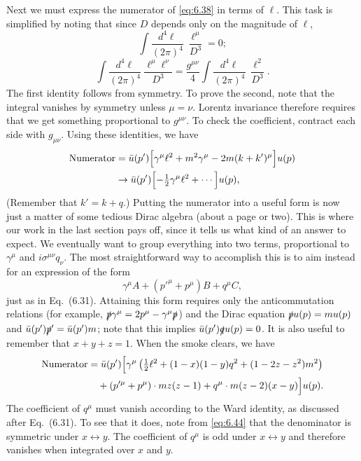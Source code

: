 Next we must express the numerator of \eqref{eq:6.38} in terms of $\ell$.
This task is simplified by noting that since $D$ depends only on the
magnitude of $\ell$,
\begin{equation}
  \int \frac{d^4\ell}{(2\pi)^4}\ \frac{\ell^\mu}{D^3} = 0;
  \label{eq:6.45}
\end{equation}
\begin{equation}
  \int \frac{d^4\ell}{(2\pi)^4}\ \frac{\ell^\mu\ell^\nu}{D^3}
    = \frac{g^{\mu\nu}}{4}\int \frac{d^4\ell}{(2\pi)^4}\ \frac{\ell^2}{D^3} .
  \label{eq:6.46}
\end{equation}
The first identity follows from symmetry.  To prove the second, note that the
integral vanishes by symmetry unless $\mu = \nu$.  Lorentz invariance therefore
requires that we get something proportional to $g^{\mu\nu}$.  To check the
coefficient, contract each side with $g_{\mu\nu}$.  Using these identities, we
have
\begin{equation}
  \begin{aligned}
    \text{Numerator} &= \bar{u}(p')\Bigl[ \gamma^\mu\ell^2 + m^2\gamma^\mu
      - 2m(k+k')^\mu \Bigr]u(p)\\
    &\to \bar{u}(p')\Bigl[ -\tfrac{1}{2}\gamma^\mu\ell^2
      + \cdots \Bigr]u(p),
  \end{aligned}
\end{equation}
(Remember that $k' = k+q$.)
Putting the numerator into a useful form is now just a matter of some tedious
Dirac algebra (about a page or two).  This is where our work in the last
section pays off, since it tells us what kind of an answer to expect.  We
eventually want to group everything into two terms, proportional to
$\gamma^\mu$ and $i\sigma^{\mu\nu}q_\nu$.  The most straightforward way to
accomplish this is to aim instead for an expression of the form
\begin{equation}
  \gamma^\mu A + (p'^{\mu}+p^\mu)B + q^\mu C,
\end{equation}
just as in Eq.~(6.31).  Attaining this form requires only the
anticommutation relations (for example, $\slashed{p}\gamma^\mu =
2p^\mu - \gamma^\mu\slashed{p}$) and the Dirac equation $\slashed{p}u(p) =
mu(p)$ and $\bar{u}(p')\slashed{p}' = \bar{u}(p')m$; note that this implies
$\bar{u}(p')\slashed{q}u(p) = 0$.  It is also useful to remember that
$x+y+z = 1$.  When the smoke clears, we have
\begin{equation}
  \begin{aligned}
    \text{Numerator} &= \bar{u}(p')\Bigl[ \gamma^\mu\,
      \bigl( \tfrac{1}{2}\ell^2 + (1-x)(1-y)q^2 + (1-2z-z^2)m^2 \bigr)\\
    &\quad + (p'^{\mu}+p^\mu)\cdot mz(z-1)
      + q^\mu\cdot m(z-2)(x-y) \Bigr]u(p) .
  \end{aligned}
\end{equation}
The coefficient of $q^\mu$ must vanish according to the Ward identity, as
discussed after Eq.~(6.31).  To see that it does, note from
\eqref{eq:6.44} that the denominator is symmetric under $x\leftrightarrow y$.
The coefficient of $q^\mu$ is odd under $x\leftrightarrow y$ and therefore
vanishes when integrated over $x$ and $y$.

